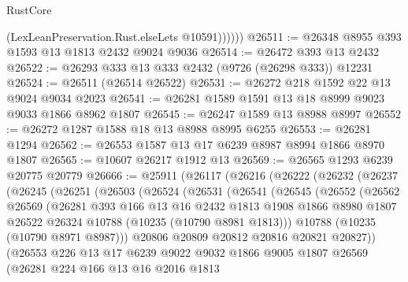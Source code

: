 \begin{lexlean}{RustCore}
\begin{coremodule}
              (LexLeanPreservation.Rust.elseLets @10591))))))
@26511 := @26348 @8955 @393 @1593 @13 @1813 @2432 @9024 @9036
@26514 := @26472 @393 @13 @2432
@26522 := @26293 @333 @13 @333 @2432 (@9726 (@26298 @333)) @12231
@26524 := @26511 (@26514 @26522)
@26531 := @26272 @218 @1592 @22 @13 @9024 @9034 @2023
@26541 := @26281 @1589 @1591 @13 @18 @8999 @9023 @9033 @1866 @8962 @1807
@26545 := @26247 @1589 @13 @8988 @8997
@26552 := @26272 @1287 @1588 @18 @13 @8988 @8995 @6255
@26553 := @26281 @1294
@26562 := @26553 @1587 @13 @17 @6239 @8987 @8994 @1866 @8970 @1807
@26565 := @10607 @26217 @1912 @13
@26569 := @26565 @1293 @6239 @20775 @20779
@26666 := @25911
    (@26117
      (@26216
        (@26222
          (@26232
            (@26237
              (@26245
                (@26251
                  (@26503
                    (@26524
                      (@26531
                        (@26541
                          (@26545
                            (@26552
                              (@26562
                                @26569
                                (@26281
                                  @393
                                  @166
                                  @13
                                  @16
                                  @2432
                                  @1813
                                  @1908
                                  @1866
                                  @8980
                                  @1807
                                  @26522
                                  @26324
                                  @10788
                                  (@10235 (@10790 @8981 @1813)))
                                @10788
                                (@10235 (@10790 @8971 @8987)))
                              @20806
                              @20809
                              @20812
                              @20816
                              @20821
                              @20827))
                          (@26553
                            @226
                            @13
                            @17
                            @6239
                            @9022
                            @9032
                            @1866
                            @9005
                            @1807
                            @26569
                            (@26281
                              @224
                              @166
                              @13
                              @16
                              @2016
                              @1813

\end{coremodule}
\end{lexlean}
